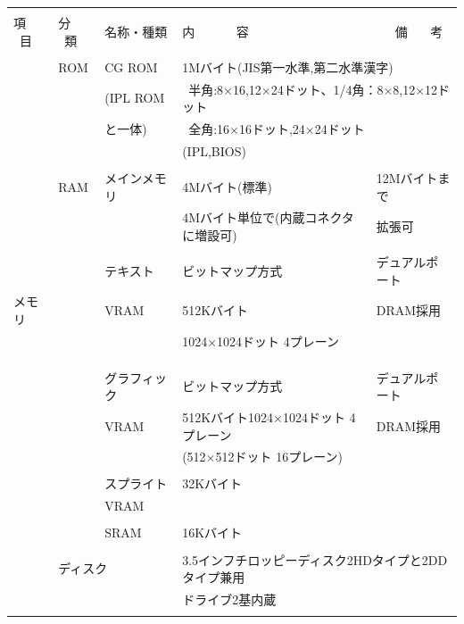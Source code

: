 \documentclass[twoside,a4paper,12pt]{article}
\begin{document}
\setlength{\tabcolsep}{0.5mm}
\begin{tabular}{|p{17mm}|p{13mm}|p{23mm}|p{80mm}|p{30mm}|}
\hline
& & & &\\[-2mm]
項 \ 目& 分 \ 類 & 名称・種類 & 内 \ \ \ \ \ \ 容 & \ \ \ 備 \ \ \ 考\\[1mm]
\hline
& & & \multicolumn{2}{l|}{}\\[-3mm]
& ROM & CG ROM & \multicolumn{2}{l|}{1Mバイト(JIS第一水準,第二水準漢字)}\\
& & (IPL ROM & \multicolumn{2}{l|}{\ 半角:8×16,12×24ドット、1/4角：8×8,12×12ドット}\\
& & と一体) & \multicolumn{2}{l|}{\ 全角:16×16ドット,24×24ドット}\\
& & & \multicolumn{2}{l|}{(IPL,BIOS)}\\
\cline{2-5}
& & & &\\[-3mm]
& RAM & メインメモリ & 4Mバイト(標準) & 12Mバイトまで\\
& & & 4Mバイト単位で(内蔵コネクタに増設可) & 拡張可\\
\cline{3-5}
& & & &\\[-3mm]
& & テキスト & ビットマップ方式 & デュアルポート\\
メモリ & & VRAM & 512Kバイト & DRAM採用\\
& & & 1024×1024ドット 4プレーン &\\
& & & &\\
& & & &\\
\cline{3-5}
& & & &\\[-3mm]
& & グラフィック & ビットマップ方式 & デュアルポート\\
& & VRAM & 512Kバイト1024×1024ドット 4プレーン & DRAM採用\\
& & & (512×512ドット 16プレーン) &\\
\cline{3-5}
& & & \multicolumn{2}{l|}{}\\[-3mm]
& & スプライト & \multicolumn{2}{l|}{32Kバイト}\\
& & VRAM & \multicolumn{2}{l|}{}\\
\cline{3-5}
& & & \multicolumn{2}{l|}{}\\[-3mm]
& & SRAM & \multicolumn{2}{l|}{16Kバイト}\\
\hline
& \multicolumn{4}{l|}{}\\[-3mm]
& \multicolumn{2}{l}{ディスク} & \multicolumn{2}{l|}{3.5インフチロッピーディスク2HDタイプと2DDタイプ兼用}\\
& \multicolumn{2}{l}{} & \multicolumn{2}{l|}{ドライブ2基内蔵}\\
& \multicolumn{4}{l|}{}\\

\end{tabular}
\end{document}
